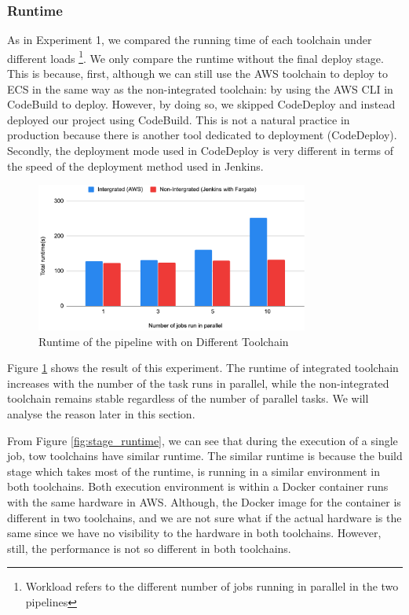 \subsubsection{Runtime}
As in Experiment 1, we compared the running time of each toolchain under different loads \footnote{Workload refers to the different number of jobs running in parallel in the two pipelines}. We only compare the runtime without the final deploy stage. This is because, first, although we can still use the AWS toolchain to deploy to ECS in the same way as the non-integrated toolchain: by using the AWS CLI in CodeBuild to deploy. However, by doing so, we skipped CodeDeploy and instead deployed our project using CodeBuild. This is not a natural practice in production because there is another tool dedicated to deployment (CodeDeploy). Secondly, the deployment mode used in CodeDeploy is very different in terms of the speed of the deployment method used in Jenkins. 
\begin{figure}[!h]
  \centering
  \includegraphics[width=0.80\textwidth]{pics/compare-aws.png}
  \caption{Runtime of the pipeline with on Different Toolchain}
  \label{fig:compareaws}
\end{figure}
Figure \ref{fig:compareaws} shows the result of this experiment. The runtime of integrated toolchain increases with the number of the task runs in parallel, while the non-integrated toolchain remains stable regardless of the number of parallel tasks. We will analyse the reason later in this section.
\par
From Figure \ref{fig:stage_runtime}, we can see that during the execution of a single job, tow toolchains have similar runtime. The similar runtime is because the build stage which takes most of the runtime, is running in a similar environment in both toolchains. Both execution environment is within a Docker container runs with the same hardware in AWS. Although, the Docker image for the container is different in two toolchains, and we are not sure what if the actual hardware is the same since we have no visibility to the hardware in both toolchains. However, still, the performance is not so different in both toolchains.
